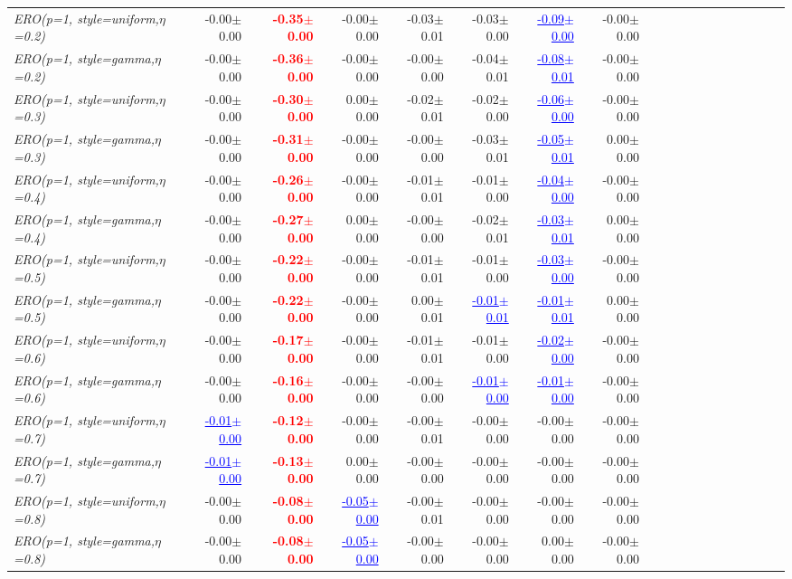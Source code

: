 \documentclass[nohyperref]{article}
\theoremstyle{plain}
\theoremstyle{definition}
\theoremstyle{remark}
\newcommand{\red}[1]{\textcolor{red}{\textbf{#1}}}
\newcommand{\blue}[1]{\textcolor{blue}{\underline{#1}}}
\begin{document}
\begin{table*}[!ht]
{\begin{tabular}{lrrrrrrrrrrrrrrrrrr}
			{\it ERO(p=1, style=uniform,$\eta$=0.2)} & -0.00$\pm$0.00 & \red{-0.35$\pm$0.00} & -0.00$\pm$0.00 & -0.03$\pm$0.01 & -0.03$\pm$0.00 & \blue{-0.09$\pm$0.00} & -0.00$\pm$0.00 \\
			{\it ERO(p=1, style=gamma,$\eta$=0.2)} & -0.00$\pm$0.00 & \red{-0.36$\pm$0.00} & -0.00$\pm$0.00 & -0.00$\pm$0.00 & -0.04$\pm$0.01 & \blue{-0.08$\pm$0.01} & -0.00$\pm$0.00 \\
			{\it ERO(p=1, style=uniform,$\eta$=0.3)} & -0.00$\pm$0.00 & \red{-0.30$\pm$0.00} & 0.00$\pm$0.00 & -0.02$\pm$0.01 & -0.02$\pm$0.00 & \blue{-0.06$\pm$0.00} & -0.00$\pm$0.00 \\
			{\it ERO(p=1, style=gamma,$\eta$=0.3)} & -0.00$\pm$0.00 & \red{-0.31$\pm$0.00} & -0.00$\pm$0.00 & -0.00$\pm$0.00 & -0.03$\pm$0.01 & \blue{-0.05$\pm$0.01} & 0.00$\pm$0.00 \\
			{\it ERO(p=1, style=uniform,$\eta$=0.4)} & -0.00$\pm$0.00 & \red{-0.26$\pm$0.00} & -0.00$\pm$0.00 & -0.01$\pm$0.01 & -0.01$\pm$0.00 & \blue{-0.04$\pm$0.00} & -0.00$\pm$0.00 \\
			{\it ERO(p=1, style=gamma,$\eta$=0.4)} & -0.00$\pm$0.00 & \red{-0.27$\pm$0.00} & 0.00$\pm$0.00 & -0.00$\pm$0.00 & -0.02$\pm$0.01 & \blue{-0.03$\pm$0.01} & 0.00$\pm$0.00 \\
			{\it ERO(p=1, style=uniform,$\eta$=0.5)} & -0.00$\pm$0.00 & \red{-0.22$\pm$0.00} & -0.00$\pm$0.00 & -0.01$\pm$0.01 & -0.01$\pm$0.00 & \blue{-0.03$\pm$0.00} & -0.00$\pm$0.00 \\
			{\it ERO(p=1, style=gamma,$\eta$=0.5)} & -0.00$\pm$0.00 & \red{-0.22$\pm$0.00} & -0.00$\pm$0.00 & 0.00$\pm$0.01 & \blue{-0.01$\pm$0.01} & \blue{-0.01$\pm$0.01} & 0.00$\pm$0.00 \\
			{\it ERO(p=1, style=uniform,$\eta$=0.6)} & -0.00$\pm$0.00 & \red{-0.17$\pm$0.00} & -0.00$\pm$0.00 & -0.01$\pm$0.01 & -0.01$\pm$0.00 & \blue{-0.02$\pm$0.00} & -0.00$\pm$0.00 \\
			{\it ERO(p=1, style=gamma,$\eta$=0.6)} & -0.00$\pm$0.00 & \red{-0.16$\pm$0.00} & -0.00$\pm$0.00 & -0.00$\pm$0.00 & \blue{-0.01$\pm$0.00} & \blue{-0.01$\pm$0.00} & -0.00$\pm$0.00 \\
			{\it ERO(p=1, style=uniform,$\eta$=0.7)} & \blue{-0.01$\pm$0.00} & \red{-0.12$\pm$0.00} & -0.00$\pm$0.00 & -0.00$\pm$0.01 & -0.00$\pm$0.00 & -0.00$\pm$0.00 & -0.00$\pm$0.00 \\
			{\it ERO(p=1, style=gamma,$\eta$=0.7)} & \blue{-0.01$\pm$0.00} & \red{-0.13$\pm$0.00} & 0.00$\pm$0.00 & -0.00$\pm$0.00 & -0.00$\pm$0.00 & -0.00$\pm$0.00 & -0.00$\pm$0.00 \\
			{\it ERO(p=1, style=uniform,$\eta$=0.8)} & -0.00$\pm$0.00 & \red{-0.08$\pm$0.00} & \blue{-0.05$\pm$0.00} & -0.00$\pm$0.01 & -0.00$\pm$0.00 & -0.00$\pm$0.00 & -0.00$\pm$0.00 \\
			{\it ERO(p=1, style=gamma,$\eta$=0.8)} & -0.00$\pm$0.00 & \red{-0.08$\pm$0.00} & \blue{-0.05$\pm$0.00} & -0.00$\pm$0.00 & -0.00$\pm$0.00 & 0.00$\pm$0.00 & -0.00$\pm$0.00 \\
\bottomrule
\end{tabular}}
\end{table*}
\end{document}
